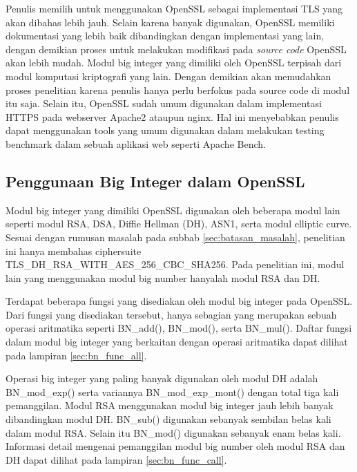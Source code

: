 Penulis memilih untuk menggunakan OpenSSL sebagai implementasi TLS yang akan dibahas lebih jauh. Selain karena banyak digunakan, OpenSSL memiliki dokumentasi yang lebih baik dibandingkan dengan implementasi yang lain, dengan demikian proses untuk melakukan modifikasi pada \textit{source code} OpenSSL akan lebih mudah. Modul big integer yang dimiliki oleh OpenSSL terpisah dari modul komputasi kriptografi yang lain. Dengan demikian akan memudahkan proses penelitian karena penulis hanya perlu berfokus pada source code di modul itu saja. Selain itu, OpenSSL sudah umum digunakan dalam implementasi HTTPS pada webserver Apache2 ataupun nginx. Hal ini menyebabkan penulis dapat menggunakan tools yang umum digunakan dalam melakukan testing benchmark dalam sebuah aplikasi web seperti Apache Bench.

\subsection{Penggunaan Big Integer dalam OpenSSL}
Modul big integer yang dimiliki OpenSSL digunakan oleh beberapa modul lain seperti modul RSA, DSA, Diffie Hellman (DH), ASN1, serta modul elliptic curve. Sesuai dengan rumusan masalah pada subbab \ref{sec:batasan_masalah}, penelitian ini hanya membahas ciphersuite TLS\_DH\_RSA\_WITH\_AES\_256\_CBC\_SHA256. Pada penelitian ini, modul lain yang menggunakan modul big number hanyalah modul RSA dan DH.

Terdapat beberapa fungsi yang disediakan oleh modul big integer pada OpenSSL. Dari fungsi yang disediakan tersebut, hanya sebagian yang merupakan sebuah operasi aritmatika seperti BN\_add(), BN\_mod(), serta BN\_mul(). Daftar fungsi dalam modul big integer yang berkaitan dengan operasi aritmatika dapat dilihat pada lampiran \ref{sec:bn_func_all}.

Operasi big integer yang paling banyak digunakan oleh modul DH adalah BN\_mod\_exp() serta variannya BN\_mod\_exp\_mont() dengan total tiga kali pemanggilan. Modul RSA menggunakan modul big integer jauh lebih banyak dibandingkan modul DH. BN\_sub() digunakan sebanyak sembilan belas kali dalam modul RSA. Selain itu BN\_mod() digunakan sebanyak enam belas kali. Informasi detail mengenai pemanggilan modul big number oleh modul RSA dan DH dapat dilihat pada lampiran \ref{sec:bn_func_call}.
